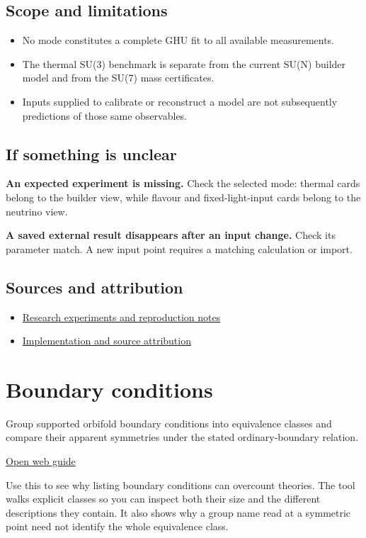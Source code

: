 \documentclass[11pt,a4paper]{article}
\begin{document}
\subsection*{Scope and limitations}
\begin{itemize}
\item No mode constitutes a complete GHU fit to all available measurements.
\item The thermal SU(3) benchmark is separate from the current SU(N) builder model and from the SU(7) mass certificates.
\item Inputs supplied to calibrate or reconstruct a model are not subsequently predictions of those same observables.
\end{itemize}
\subsection*{If something is unclear}
\textbf{An expected experiment is missing.} Check the selected mode: thermal cards belong to the builder view, while flavour and fixed-light-input cards belong to the neutrino view.

\textbf{A saved external result disappears after an input change.} Check its parameter match. A new input point requires a matching calculation or import.

\subsection*{Sources and attribution}
\begin{itemize}
\item \href{https://github.com/karlesmarin/ghu-lab/blob/main/docs/research-extensions.md}{Research experiments and reproduction notes}
\item \href{https://github.com/karlesmarin/ghu-lab/blob/main/src/sections/predict_section.js}{Implementation and source attribution}
\end{itemize}
\section{Boundary conditions}
Group supported orbifold boundary conditions into equivalence classes and compare their apparent symmetries under the stated ordinary-boundary relation.

\href{https://karlesmarin.github.io/ghu-explorer/guide/bcclass/index.html}{Open web guide}

Use this to see why listing boundary conditions can overcount theories. The tool walks explicit classes so you can inspect both their size and the different descriptions they contain. It also shows why a group name read at a symmetric point need not identify the whole equivalence class.
\end{document}
